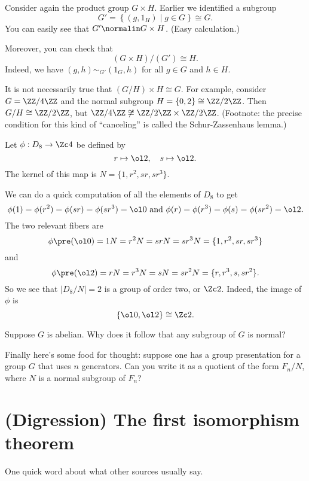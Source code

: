 \begin{example}
	Consider again the product group $G \times H$.
	Earlier we identified a subgroup
	\[ G' =  \left\{ (g, 1_H) \mid g \in G \right\} \cong G. \]
	You can easily see that $G' \normalin G \times H$.
	(Easy calculation.)

	Moreover, you can check that
	\[ (G \times H) / (G') \cong H. \]
	Indeed, we have $(g, h) \sim_{G'} (1_G, h)$ for all $g \in G$ and $h \in H$.
\end{example}
\begin{example}
	It is not necessarily true that $(G/H) \times H \cong G$.
	For example, consider $G = \ZZ/4\ZZ$
	and the normal subgroup $H = \{0,2\} \cong \ZZ/2\ZZ$.
	Then $G/H \cong \ZZ/2\ZZ$,
	but $\ZZ/4\ZZ \not\cong \ZZ/2\ZZ \times \ZZ/2\ZZ$.
	(Footnote: the precise condition for this kind of ``canceling'' is called the Schur-Zassenhaus lemma.)
\end{example}
\begin{example}
	Let $\phi: D_8 \to \Zc 4$ be defined by \[ r \mapsto \ol 2, \quad s \mapsto \ol 2. \]
	The kernel of this map is $N = \{1,r^2,sr,sr^3\}$.

	We can do a quick computation of all the elements of $D_8$ to get
	\[ \phi(1) = \phi(r^2) = \phi(sr) = \phi(sr^3) = \ol 0
	\text{ and }
	 \phi(r) = \phi(r^3) = \phi(s) = \phi(sr^2) = \ol 2. \]
	The two relevant fibers are \[ \phi\pre(\ol 0) = 1N = r^2N = srN = sr^3N = \{1,r^2,sr,sr^3\} \] and
	\[ \phi\pre(\ol 2) = rN = r^3N = sN = sr^2N = \{r,r^3,s,sr^2\}. \]
	So we see that $|D_8/N| = 2$ is a group of order two, or $\Zc 2$.
	Indeed, the image of $\phi$ is \[ \left\{ \ol 0, \ol 2 \right\} \cong \Zc 2. \]
\end{example}

\begin{ques}
	Suppose $G$ is abelian.
	Why does it follow that any subgroup of $G$ is normal?
\end{ques}


Finally here's some food for thought:
suppose one has a group presentation for a group $G$
that uses $n$ generators.
Can you write it as a quotient of the form $F_n / N$,
where $N$ is a normal subgroup of $F_n$?

\section{(Digression) The first isomorphism theorem}
\label{sec:first_isomorphism_thm}
One quick word about what other sources usually say.

